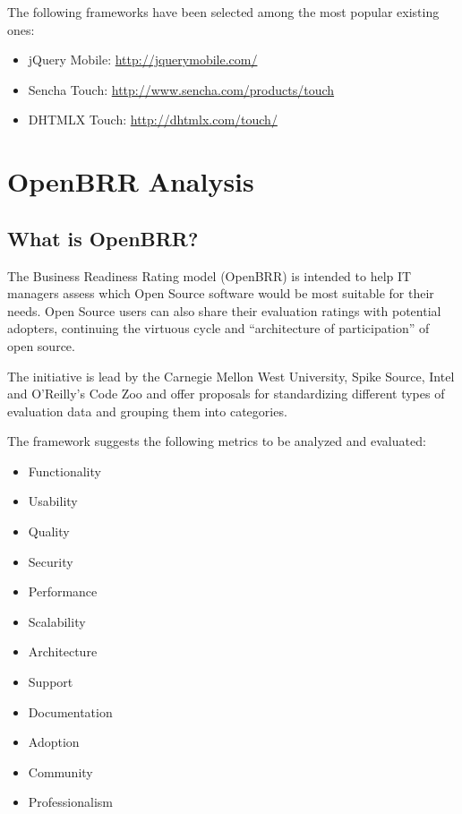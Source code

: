 \documentclass[a4paper,12pt]{book}
\begin{document}
The following frameworks have been selected among the most popular existing ones:

\begin{itemize}
 \item jQuery Mobile: \url{http://jquerymobile.com/}
 \item Sencha Touch: \url{http://www.sencha.com/products/touch}
 \item DHTMLX Touch: \url{http://dhtmlx.com/touch/}
\end{itemize}


\chapter{OpenBRR Analysis}
\label{chap:openbrr}

\section{What is OpenBRR?}
\label{sec:openbrr2}

The Business Readiness Rating model (OpenBRR)\cite{OpenBRRWhitepaper} is
intended to help IT managers assess which Open Source software would be most suitable for their needs. Open Source users can also share their evaluation ratings with potential adopters, continuing the virtuous cycle and “architecture of participation” of open
source.

The initiative is lead by the Carnegie Mellon West University, Spike Source,
Intel and O’Reilly’s Code Zoo and offer proposals for standardizing different
types of evaluation data and grouping them into categories.

The framework suggests the following metrics to be analyzed and evaluated:
\begin{itemize}
\item Functionality
\item Usability
\item Quality
\item Security
\item Performance
\item Scalability
\item Architecture
\item Support
\item Documentation
\item Adoption
\item Community
\item Professionalism
\end{itemize}
\end{document}
